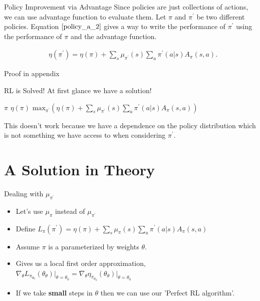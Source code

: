 \documentclass{beamer}
\begin{document}
\begin{frame}{Policy Improvement via Advantage}
Since policies are just collections of actions, we can use advantage function to evaluate them. Let $\pi$ and $\pi^\prime$ be two different policies. Equation $\ref{policy_a_2}$ gives a way to write the performance of $\pi^\prime$ using the performance of $\pi$ and the advantage function. 

\begin{align}
    &\eta(\pi^\prime) = \eta(\pi) + \sum_s \mu_{\pi^\prime}(s) \sum_a \pi^\prime(a \vert  s) A_{\pi}(s,a). \label{policy_a_2}
\end{align} 

Proof in appendix

\end{frame}

\begin{frame}{RL is Solved!}
At first glance we have a solution! 

\begin{algorithm}[H]
\caption{The Perfect RL Algorithm}
\begin{algorithmic}[1]
\REQUIRE $\pi$  $ \eta(\pi)$
\STATE $\text{max}_{\pi^\prime} \left( \eta(\pi) + \sum_s \mu_{\pi^\prime}(s) \sum_a \pi^\prime(a \vert  s) A_{\pi}(s,a) \right)$
\end{algorithmic}
\end{algorithm}

This doesn't work because we have a dependence on the policy distribution which is not something we have access to when considering $\pi^\prime$.

\end{frame}

\section{A Solution in Theory}

\begin{frame}{Dealing with $\mu_{\pi^\prime}$}

\begin{itemize}
    \item Let's use $\mu_{\pi}$ instead of $\mu_{\pi^\prime}$
    \item Define $L_{\pi}(\pi^\prime) = \eta(\pi) +  \sum_s \mu_{\pi}(s) \sum_a \pi^\prime(a \vert  s) A_{\pi}(s,a) $
    \item Assume $\pi$ is a parameterized by weights $\theta$. 
    \item Gives us a local first order approximation, $\nabla_\theta L_{\pi_{\theta_0}} (\theta_\theta) \vert_{\theta=\theta_0}  = \nabla_\theta \eta_{\pi_{\theta_0}} (\theta_\theta) \vert_{\theta=\theta_0}$
    \item If we take \textbf{small} steps in $\theta$ then we can use our 'Perfect RL algorithm'.
\end{itemize}
\end{frame}
\end{document}
